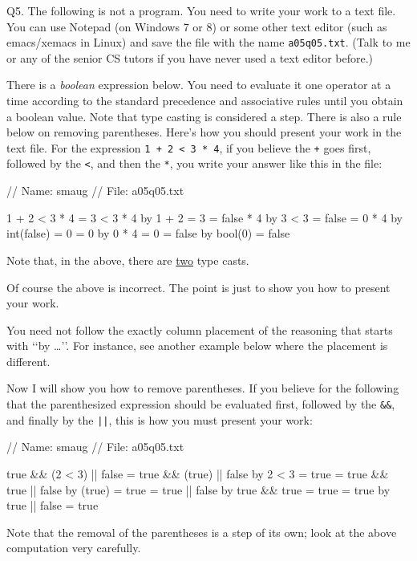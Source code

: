 Q5. The following is not a program. You need to write your work to a text file.
You can use Notepad (on Windows 7 or 8) or some other text editor
(such as emacs/xemacs in Linux) and save the file with the name
\verb!a05q05.txt!. (Talk to me or any of the senior CS tutors if you have never
used a text editor before.)

There is a \textit{boolean} expression below.
You need to evaluate it one operator at a
time according to the standard precedence and associative rules
until you obtain a boolean value.
Note that
type casting is considered a step. There is also a rule below on removing
parentheses. Here's how you should present your work in the text file. For the
expression \verb!1 + 2 < 3 * 4!, if you believe the \verb!+! goes first,
followed by the \verb!<!, and then the \verb!*!,  you write your answer like
this in the file:
\begin{console}
// Name: smaug
// File: a05q05.txt

1 + 2 < 3 * 4
= 3 < 3 * 4                                       by 1 + 2 = 3
= false * 4                                       by 3 < 3 = false
= 0 * 4                                           by int(false) = 0
= 0                                               by 0 * 4 = 0
= false                                           by bool(0) = false
\end{console}
Note that, in the above, there are \underline{two} type casts.

Of course the above is incorrect. The point is just to show you how to present
your work.

You need not follow the exactly column placement of the reasoning
that starts with \lq\lq by \dots\rq\rq. For instance, see another example
below where the placement is different.

Now I will show you how to remove parentheses. If you believe for the following
that the parenthesized expression should be evaluated first, followed by the
\verb!&&!, and finally by the \verb!||!, this is how you must present your
work:
\begin{console}
// Name: smaug
// File: a05q05.txt

true && (2 < 3) || false
= true && (true) || false                 by 2 < 3 = true
= true && true || false                   by (true) = true
= true || false                           by true && true = true
= true                                    by true || false = true
\end{console}
Note that the removal of the parentheses is a step of its own; look
at the above
computation very carefully.

